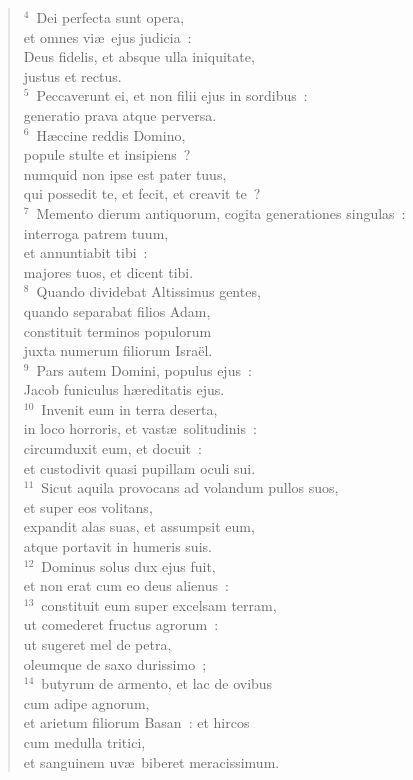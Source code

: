 \begin{verse}${}^{4}$~Dei perfecta sunt opera,\\ et omnes vi\ae\ ejus judicia~:\\ Deus fidelis, et absque ulla iniquitate,\\ justus et rectus.\\
${}^{5}$~Peccaverunt ei, et non filii ejus in sordibus~:\\ generatio prava atque perversa.\\
${}^{6}$~H\ae ccine reddis Domino,\\ popule stulte et insipiens~?\\ numquid non ipse est pater tuus,\\ qui possedit te, et fecit, et creavit te~?\\
${}^{7}$~Memento dierum antiquorum, cogita generationes singulas~:\\ interroga patrem tuum,\\ et annuntiabit tibi~:\\ majores tuos, et dicent tibi.\\
${}^{8}$~Quando dividebat Altissimus gentes,\\ quando separabat filios Adam,\\ constituit terminos populorum\\ juxta numerum filiorum Isra\"el.\\
${}^{9}$~Pars autem Domini, populus ejus~:\\ Jacob funiculus h\ae reditatis ejus.\\
${}^{10}$~Invenit eum in terra deserta,\\ in loco horroris, et vast\ae\ solitudinis~:\\ circumduxit eum, et docuit~:\\ et custodivit quasi pupillam oculi sui.\\
${}^{11}$~Sicut aquila provocans ad volandum pullos suos,\\ et super eos volitans,\\ expandit alas suas, et assumpsit eum,\\ atque portavit in humeris suis.\\
${}^{12}$~Dominus solus dux ejus fuit,\\ et non erat cum eo deus alienus~:\\
${}^{13}$~constituit eum super excelsam terram,\\ ut comederet fructus agrorum~:\\ ut sugeret mel de petra,\\ oleumque de saxo durissimo~;\\
${}^{14}$~butyrum de armento, et lac de ovibus\\ cum adipe agnorum,\\ et arietum filiorum Basan~: et hircos\\ cum medulla tritici,\\ et sanguinem uv\ae\ biberet meracissimum.\end{verse}


